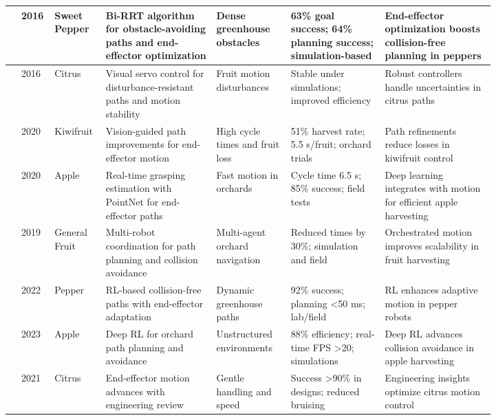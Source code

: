 \documentclass{ieeeaccess}
\begin{document}
\begin{table}[htbp]
\begin{tabular}{p{0.025\linewidth} p{0.025\linewidth} p{0.055\linewidth} p{0.2\linewidth} p{0.135\linewidth} p{0.175\linewidth} p{0.2\linewidth}}
\cite{bac2016analysis} & 2016 & Sweet Pepper & Bi-RRT algorithm for obstacle-avoiding paths and end-effector optimization & Dense greenhouse obstacles & 63\% goal success; 64\% planning success; simulation-based & End-effector optimization boosts collision-free planning in peppers \\ \midrule
\cite{mehta2016robust} & 2016 & Citrus & Visual servo control for disturbance-resistant paths and motion stability & Fruit motion disturbances & Stable under simulations; improved efficiency & Robust controllers handle uncertainties in citrus paths \\ \midrule
\cite{williams2020improvements} & 2020 & Kiwifruit & Vision-guided path improvements for end-effector motion & High cycle times and fruit loss & 51\% harvest rate; 5.5 s/fruit; orchard trials & Path refinements reduce losses in kiwifruit control \\ \midrule
\cite{kang2020real} & 2020 & Apple & Real-time grasping estimation with PointNet for end-effector paths  & Fast motion in orchards & Cycle time 6.5 s; 85\% success; field tests & Deep learning integrates with motion for efficient apple harvesting \\ \midrule
\cite{vougioukas2019orchestra} & 2019 & General Fruit & Multi-robot coordination for path planning and collision avoidance  & Multi-agent orchard navigation & Reduced times by 30\%; simulation and field & Orchestrated motion improves scalability in fruit harvesting \\ \midrule
\cite{verbiest2022path} & 2022 & Pepper & RL-based collision-free paths with end-effector adaptation  & Dynamic greenhouse paths & 92\% success; planning <50 ms; lab/field & RL enhances adaptive motion in pepper robots \\ \midrule
\cite{zhang2023deep} & 2023 & Apple & Deep RL for orchard path planning and avoidance & Unstructured environments & 88\% efficiency; real-time FPS >20; simulations & Deep RL advances collision avoidance in apple harvesting \\ \midrule
\cite{burks2021engineering} & 2021 & Citrus & End-effector motion advances with engineering review  & Gentle handling and speed & Success >90\% in designs; reduced bruising & Engineering insights optimize citrus motion control \\ 
\bottomrule
\end{tabular}
\end{table}
\end{document}
